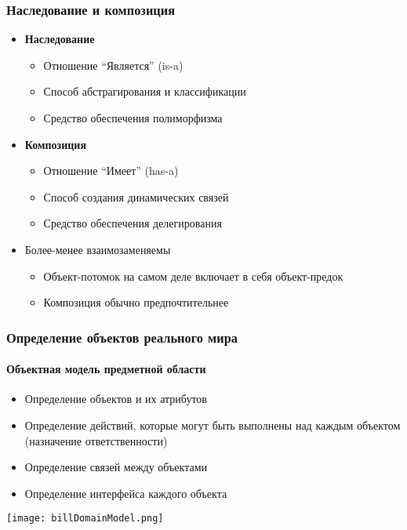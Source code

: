 \documentclass{../../slides-style}
\begin{document}
    \begin{frame}
        \frametitle{Наследование и композиция}
        \begin{itemize}
            \item \textbf{Наследование}
            \begin{itemize}
                \item Отношение ``Является'' (is-a)
                \item Способ абстрагирования и классификации
                \item Средство обеспечения полиморфизма
            \end{itemize}
            \item \textbf{Композиция}
            \begin{itemize}
                \item Отношение ``Имеет'' (has-a)
                \item Способ создания динамических связей
                \item Средство обеспечения делегирования
            \end{itemize}
            \item Более-менее взаимозаменяемы
            \begin{itemize}
                \item Объект-потомок на самом деле включает в себя объект-предок
                \item Композиция обычно предпочтительнее
            \end{itemize}
        \end{itemize}
    \end{frame}

    \begin{frame}
        \frametitle{Определение объектов реального мира}
        \framesubtitle{Объектная модель предметной области}
        \begin{itemize}
            \item Определение объектов и их атрибутов
            \item Определение действий, которые могут быть выполнены над каждым объектом (назначение ответственности)
            \item Определение связей между объектами
            \item Определение интерфейса каждого объекта
        \end{itemize}
        \begin{center}
            \texttt{[image: billDomainModel.png]}
        \end{center}
    \end{frame}
\end{document}
